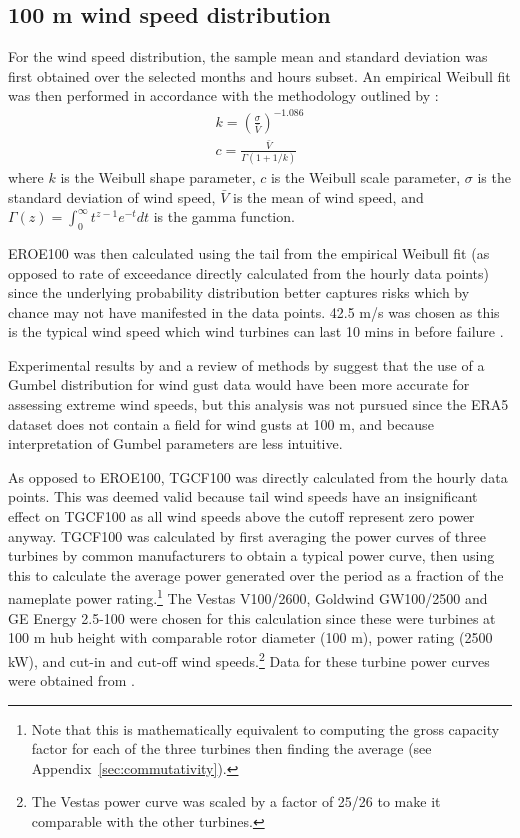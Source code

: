 \subsection{100 m wind speed distribution}
\label{ssec:method_wsd}

For the wind speed distribution, the sample mean and standard deviation was first obtained over the selected months and hours subset. An empirical Weibull fit was then performed in accordance with the methodology outlined by \citep{justus1977}:
\begin{eqnarray}
	k = \left( \frac{\sigma}{\bar{V}} \right)^{-1.086} \\ 
	c = \frac{\bar{V}}{\Gamma (1 + 1/k)}
\end{eqnarray}
where $k$ is the Weibull shape parameter, $c$ is the Weibull scale parameter, $\sigma$ is the standard deviation of wind speed, $\bar{V}$ is the mean of wind speed, and $\Gamma (z) = \int_0^\infty t^{z-1} e^{-t} dt$ is the gamma function.

\ac{EROE100} was then calculated using the tail from the empirical Weibull fit (as opposed to rate of exceedance directly calculated from the hourly data points) since the underlying probability distribution better captures risks which by chance may not have manifested in the data points. 42.5 m/s was chosen as this is the typical wind speed which wind turbines can last 10 mins in before failure \citep{chen2015, chen2016, ge_web}.

Experimental results by \citet{lee2012} and a review of methods by \citet{palutikof1999} suggest that the use of a Gumbel distribution for wind gust data would have been more accurate for assessing extreme wind speeds, but this analysis was not pursued since the ERA5 dataset does not contain a field for wind gusts at 100 m, and because interpretation of Gumbel parameters are less intuitive.

As opposed to EROE100, \ac{TGCF100} was directly calculated from the hourly data points. This was deemed valid because tail wind speeds have an insignificant effect on \ac{TGCF100} as all wind speeds above the cutoff represent zero power anyway. \ac{TGCF100} was calculated by first averaging the power curves of three turbines by common manufacturers to obtain a typical power curve, then using this to calculate the average power generated over the period as a fraction of the nameplate power rating.\footnote{Note that this is mathematically equivalent to computing the gross capacity factor for each of the three turbines then finding the average (see Appendix~\ref{sec:commutativity}).} The Vestas V100/2600, Goldwind GW100/2500 and GE Energy 2.5-100 were chosen for this calculation since these were turbines at 100 m hub height with comparable rotor diameter (100 m), power rating (2500 kW), and cut-in and cut-off wind speeds.\footnote{The Vestas power curve was scaled by a factor of 25/26 to make it comparable with the other turbines.} Data for these turbine power curves were obtained from \citet{twp_ge, twp_gw, twp_vt}.

